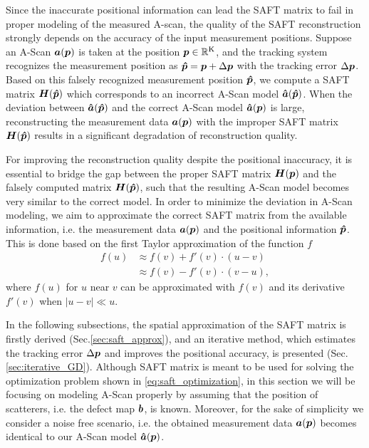Since the inaccurate positional information can lead the SAFT matrix to fail in proper modeling of the measured A-scan, the quality of the SAFT reconstruction strongly depends on the accuracy of the input measurement positions. Suppose an A-Scan $\bm{a} (\bm{p})$ is taken at the position $\bm{p} \in {\mathbb{R}}^{\operatorname{K}}$, and the tracking system recognizes the measurement position as $\bm{\hat{p}} = \bm{p} + \Delta \bm{p}$ with the tracking error $\Delta \bm{p}$. Based on this falsely recognized measurement position $\bm{\hat{p}}$, we compute a SAFT matrix $\bm{H} (\bm{\hat{p}})$ which corresponds to an incorrect A-Scan model $\bm{\hat{a}} (\bm{\hat{p}})$. When the deviation between $\bm{\hat{a}} (\bm{\hat{p}})$ and the correct A-Scan model $\bm{\hat{a}} (\bm{p})$ is large, reconstructing the measurement data $\bm{a} (\bm{p})$ with the improper SAFT matrix $\bm{H} (\bm{\hat{p}})$ results in a significant degradation of reconstruction quality. \par

For improving the reconstruction quality despite the positional inaccuracy, it is essential to bridge the gap between the proper SAFT matrix $\bm{H} (\bm{p})$ and the falsely computed matrix $\bm{H} (\bm{\hat{p}})$, such that the resulting A-Scan model becomes very similar to the correct model. In order to minimize the deviation in A-Scan modeling, we aim to approximate the correct SAFT matrix from the available information, i.e. the measurement data $\bm{a} (\bm{p})$ and the positional information $\bm{\hat{p}}$. This is done based on the first Taylor approximation of the function $f$ 
\begin{equation}
\begin{split}
f (u) & \approx f (v) + f' (v) \cdot (u - v) \\
        & \approx f (v) - f' (v) \cdot (v - u),
\end{split}
\end{equation} 
where $f(u)$ for $u$ near $v$ can be approximated with $f(v)$ and its derivative $f'(v)$ when $|u - v| \ll u$. \par

In the following subsections, the spatial approximation of the SAFT matrix is firstly derived (Sec.\ref{sec:saft_approx}), and an iterative method, which estimates the tracking error $\Delta \bm{p}$ and improves the positional accuracy, is presented (Sec.\ref{sec:iterative_GD}). Although SAFT matrix is meant to be used for solving the optimization problem shown in \eqref{eq:saft_optimization}, in this section we will be focusing on modeling A-Scan properly by assuming that the position of scatterers, i.e. the defect map $\bm{b}$, is known. Moreover, for the sake of simplicity we consider a noise free scenario, i.e. the obtained measurement data $\bm{a} (\bm{p})$ becomes identical to our A-Scan model $\bm{\hat{a}} (\bm{p})$. \par


